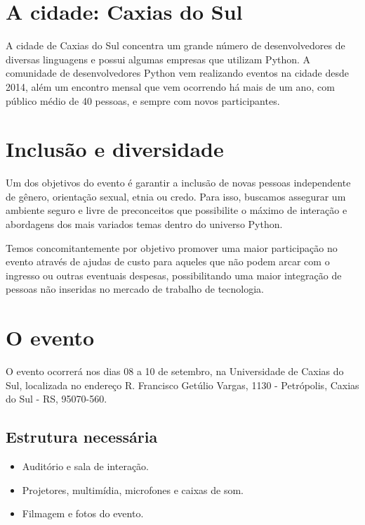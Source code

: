 \documentclass[12pt]{article}
\begin{document}
\section{A cidade: Caxias do Sul}

A cidade de Caxias do Sul concentra um grande número de desenvolvedores de diversas linguagens e possui algumas empresas que utilizam Python. A comunidade de desenvolvedores Python vem realizando eventos na cidade desde 2014, além um encontro mensal que vem ocorrendo há mais de um ano, com público médio de 40 pessoas, e sempre com novos participantes.

\section{Inclusão e diversidade}

Um dos objetivos do evento é garantir a inclusão de novas pessoas independente de gênero, orientação sexual, etnia ou credo. Para isso, buscamos assegurar um ambiente seguro e livre de preconceitos que possibilite o máximo de interação e abordagens dos mais variados temas dentro do universo Python.

Temos concomitantemente por objetivo promover uma maior participação no evento através de ajudas de custo para aqueles que não podem arcar com o ingresso ou outras eventuais despesas, possibilitando uma maior integração de pessoas não inseridas no mercado de trabalho de tecnologia.

\section{O evento}

O evento ocorrerá nos dias 08 a 10 de setembro, na Universidade de Caxias do Sul, localizada no endereço R. Francisco Getúlio Vargas, 1130 - Petrópolis, Caxias do Sul - RS, 95070-560.

\subsection{Estrutura necessária}

\begin{itemize}[label={}]
    \item Auditório e sala de interação.
    \item Projetores, multimídia, microfones e caixas de som.
    \item Filmagem e fotos do evento.
\end{itemize}
\end{document}
